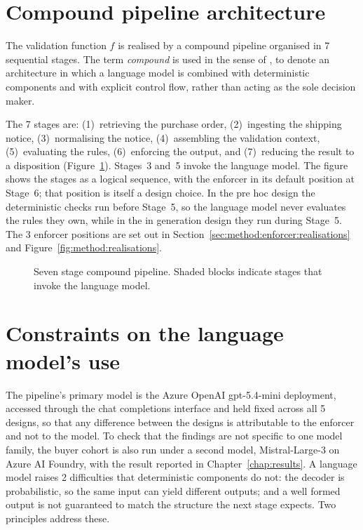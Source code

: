 \section{Compound pipeline architecture}
\label{sec:method:pipeline}

The validation function $f$ is realised by a compound pipeline organised in 7 sequential stages. The term \emph{compound} is used in the sense of \citet{zaharia2025}, to denote an architecture in which a language model is combined with deterministic components and with explicit control flow, rather than acting as the sole decision maker.

The 7 stages are: (1)~retrieving the purchase order, (2)~ingesting the shipping notice, (3)~normalising the notice, (4)~assembling the validation context, (5)~evaluating the rules, (6)~enforcing the output, and (7)~reducing the result to a disposition (Figure~\ref{fig:method:pipeline}). Stages~3 and~5 invoke the language model. The figure shows the stages as a logical sequence, with the enforcer in its default position at Stage~6; that position is itself a design choice. In the pre hoc design the deterministic checks run before Stage~5, so the language model never evaluates the rules they own, while in the in generation design they run during Stage~5. The 3 enforcer positions are set out in Section~\ref{sec:method:enforcer:realisations} and Figure~\ref{fig:method:realisations}.

\begin{figure}[htbp]
\centering
\resizebox{\textwidth}{!}{}
\caption{Seven stage compound pipeline. Shaded blocks indicate stages that invoke the language model.}
\label{fig:method:pipeline}
\end{figure}



\section{Constraints on the language model's use}
\label{sec:method:constraints}

The pipeline's primary model is the Azure OpenAI gpt-5.4-mini deployment, accessed through the chat completions interface and held fixed across all 5 designs, so that any difference between the designs is attributable to the enforcer and not to the model. To check that the findings are not specific to one model family, the buyer cohort is also run under a second model, Mistral-Large-3 on Azure AI Foundry, with the result reported in Chapter~\ref{chap:results}. A language model raises 2 difficulties that deterministic components do not: the decoder is probabilistic, so the same input can yield different outputs; and a well formed output is not guaranteed to match the structure the next stage expects. Two principles address these.

